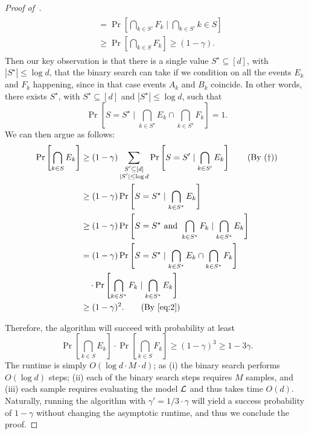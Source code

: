 \begin{proof}[Proof of~]
\begin{align}
\begin{split}
	&= \Pr\left[\bigcap_{k \in S'} F_k \mid \bigcap_{k \in S'} {k \in S}\right] \\
	&\geq \Pr\left[\bigcap_{k \in S} F_k\right] \geq (1-\gamma).
	\end{split}
\end{align}
Then our key observation is that there is a single value $S^\star \subseteq [d]$, with $|S^\star| \leq \log d$, that the binary search can take if we condition on all the events $E_k$ and $F_k$ happening, since in that case events $A_k$ and $B_k$ coincide. In other words, there exists $S^\star$, with $S^\star \subseteq [d]$ and $|S^\star| \leq \log d$, such that
\[ 
\Pr\left[S = S^\star \mid \bigcap_{k \in S^\star} E_k \cap \bigcap_{k \in S^\star} F_k\right] = 1.
\]
We can then argue as follows:
\begin{align*}
	\Pr\left[\bigcap_{k \in S} E_k\right] &\geq (1-\gamma) \sum_{\substack{S' \subseteq [d]\\ |S'| \leq \log d}} \Pr\left[S = S' \mid \bigcap_{k \in S'} E_k\right]\tag{By $(\dagger)$}\\
	&\geq (1-\gamma) \Pr\left[S = S^\star  \mid \bigcap_{k \in S^\star} E_k \right]\\
	&\geq (1-\gamma) \Pr\left[S = S^\star \text{ and } \bigcap_{k \in S^\star} F_k \mid \bigcap_{k \in S^\star} E_k \right]\\
	&= (1-\gamma) \Pr\left[S = S^\star \mid \bigcap_{k \in S^\star} E_k \cap \bigcap_{k \in S^\star} F_k\right]\\
	&\quad \cdot \Pr\left[\bigcap_{k \in S^\star} F_k \mid \bigcap_{k \in S^\star} E_k\right]\\
	&\geq (1-\gamma)^2. \tag{By~\Cref{eq:2}}
\end{align*}


Therefore, the algorithm will succeed with probability at least 
\[ 
	\Pr\left[\bigcap_{k \in S} E_k\right] \cdot \Pr\left[\bigcap_{k \in S} F_k\right] \geq (1-\gamma)^3 \geq 1-3\gamma.
\]
The runtime is simply
$O(\log d \cdot M \cdot d  )$; as (i) the binary search performs $O(\log d)$ steps; (ii) each of the binary search steps requires $M$ samples, and (iii) each sample requires evaluating the model $\mathcal{L}$ and thus takes time $O(d)$. Naturally, running the algorithm with $\gamma' = 1/3 \cdot \gamma$ will yield a success probability of $1-\gamma$ without changing the asymptotic runtime, and thus we conclude the proof.



\end{proof}
